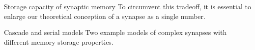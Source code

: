 \documentclass[final,hyperref={pdfpagelabels=false,bookmarks=false}]{beamer}
\begin{document}
\begin{frame}{}
\begin{columns}[t]
\begin{column}{0.33\linewidth}
\begin{block}{Storage capacity of synaptic memory}
 \vp To circumvent this tradeoff, it is essential to enlarge our theoretical conception of a synapse as a single number.
\end{block}


\begin{block}{Cascade and serial models}
%
 Two example models of complex synapses with different memory storage properties.
 \parbox[t]{0.47\linewidth}{
 \begin{center}
  \\%
  \vp\vp{}
 \end{center}
 }
 \parbox[t]{0.47\linewidth}{
 \begin{center}
 \end{center}
}


%
\end{block}




\end{column}
\end{columns}
\end{frame}
\end{document}
